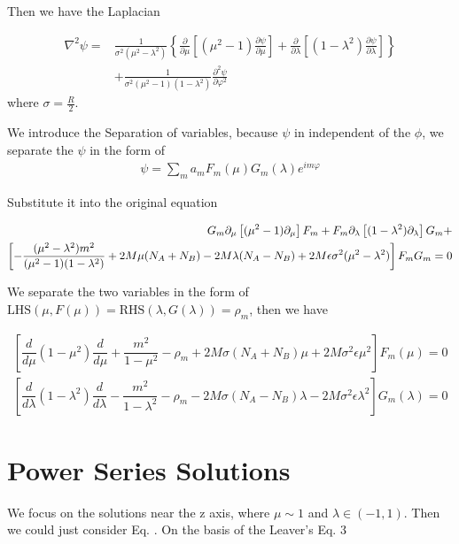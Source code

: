 \documentclass[11pt]{diazessay} %
\begin{document}
Then we have the Laplacian

\begin{align}
    \nabla^2 \psi= & \frac{1}{\sigma^2\left(\mu^2-\lambda^2\right)}\left\{\frac{\partial}{\partial \mu}\left[\left(\mu^2-1\right) \frac{\partial \psi}{\partial \mu}\right]+\frac{\partial}{\partial \lambda}\left[\left(1-\lambda^2\right) \frac{\partial \psi}{\partial \lambda}\right]\right\} \\ & +\frac{1}{\sigma^2\left(\mu^2-1\right)\left(1-\lambda^2\right)} \frac{\partial^2 \psi}{\partial \varphi^2}
\end{align}
where $\sigma=\frac{R}{2}$.

We introduce the Separation of variables, because $\psi$ in independent of the $\phi$, we separate the $\psi$ in the form of 
\begin{align}
    \psi=\sum_{m}a_m F_m(\mu)G_m(\lambda)e^{im\varphi}
\end{align}

Substitute it into the original equation

\begin{align}
    G_m\partial_\mu \left[(\mu^2-1)\partial_\mu\right]F_m + F_m\partial_\lambda\left[(1-\lambda^2)\partial_\lambda\right]G_m+\notag\\
    \left[-\frac{(\mu^2-\lambda^2)m^2}{(\mu^2-1)(1-\lambda^2)}+2M\mu(N_A+N_B)-2M\lambda(N_A-N_B)+2M\epsilon\sigma^2(\mu^2-\lambda^2)\right]F_mG_m=0\notag
\end{align}

We separate the two variables in the form of $\text{LHS}(\mu,F(\mu))=\text{RHS}(\lambda,G(\lambda))=\rho_m$, then we have

\begin{align}
        {\left[ \dfrac{d}{d\mu} \left( 1-\mu^2 \right) \dfrac{d}{d \mu}+\dfrac{m^2}{1-\mu^2}-\rho_m+2 M \sigma\left(N_A+N_B\right) \mu+2 M \sigma^2 \epsilon\mu^2\right] F_m(\mu)=0}\\
        {\left[\dfrac{d}{d \lambda}\left(1-\lambda^2\right) \dfrac{d}{d \lambda}-\dfrac{m^2}{1-\lambda^2} - \rho_m-2 M \sigma\left(N_A-N_B\right) \lambda-2 M \sigma^2 \epsilon\lambda^2\right] G_m(\lambda)=0}
\end{align}

\section{Power Series Solutions}

We focus on the solutions near the z axis, where $\mu \sim 1$ and $\lambda \in (-1,1)$. Then we could just consider Eq. . On the basis of the Leaver's Eq. 3
\end{document}
